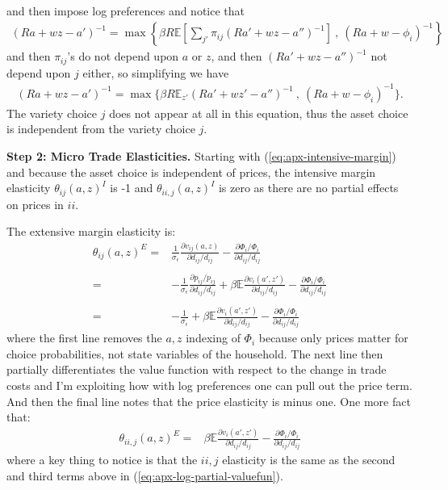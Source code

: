 \documentclass[12pt,pdftex]{article}
\begin{document}
\begin{onehalfspacing}
\begin{align}
\end{align}
and then impose log preferences and notice that
\begin{align}
(Ra + wz - a')^{-1} = \max \left\{ \beta R \mathbb{E} \left[ \sum_{j'} \pi_{ij} (Ra' + wz - a'')^{-1} \right] \ , \   (R a + w - \phi_{i})^{-1} \right \}
\end{align}
and then $\pi_{ij}$'s do not depend upon $a$ or $z$, and then $(Ra' + wz - a'')^{-1}$ not depend upon $j$ either, so simplifying we have
\begin{align}
(Ra + wz - a')^{-1} = \max \bigg \{ \beta R \mathbb{E}_{z'} (Ra' + wz' - a'')^{-1}  \ , \   (R a + w - \phi_{i})^{-1}  \bigg \}.
\end{align}
The variety choice $j$ does not appear at all in this equation, thus the asset choice is independent from the variety choice $j$.

\textbf{Step 2: Micro Trade Elasticities.} Starting with (\ref{eq:apx-intensive-margin}) and because the asset choice is independent of prices, the intensive margin elasticity $\theta_{ij}(a,z)^I$ is -1 and $\theta_{ii,j}(a,z)^I$ is zero as there are no partial effects on prices in $ii$.

The extensive margin elasticity is:
\begin{align}
\theta_{ij}(a,z)^E =& \frac{1}{\sigma_{\epsilon}}\frac{\partial v_{ij}(a,z)}{\partial d_{ij}/d_{ij}} -  \frac{\partial \Phi_{i} / \Phi_{i}}{\partial d_{ij}/d_{ij}}\\
\nonumber \\
=& -\frac{1}{\sigma_{\epsilon}}\frac{\partial p_{ij} / p_{ij}}{\partial d_{ij}/d_{ij}} + \beta \mathbb{E} \frac{\partial v_{i}(a',z')}{\partial d_{ij}/d_{ij}} -  \frac{\partial \Phi_{i} / \Phi_{i}}{\partial d_{ij}/d_{ij}} \\
\nonumber \\
=& -\frac{1}{\sigma_{\epsilon}} + \beta \mathbb{E} \frac{\partial v_{i}(a',z')}{\partial d_{ij}/d_{ij}} -  \frac{\partial \Phi_{i} / \Phi_{i}}{\partial d_{ij}/d_{ij}}
\label{eq:apx-log-partial-valuefun}
\end{align}
where the first line removes the $a,z$ indexing of $\Phi_i$ because only prices matter for choice probabilities, not state variables of the household. The next line then partially differentiates the value function with respect to the change in trade costs and I'm exploiting how with log preferences one can pull out the price term. And then the final line notes that the price elasticity is minus one. One more fact that:
\begin{align}
\theta_{ii,j}(a,z)^E =&  \beta \mathbb{E} \frac{\partial v_{i}(a',z')}{\partial d_{ij}/d_{ij}} -  \frac{\partial \Phi_{i} / \Phi_{i}}{\partial d_{ij}/d_{ij}}
\end{align}
where a key thing to notice is that the $ii,j$ elasticity is the same as the second and third terms above in (\ref{eq:apx-log-partial-valuefun}).



\end{onehalfspacing}
\end{document}
